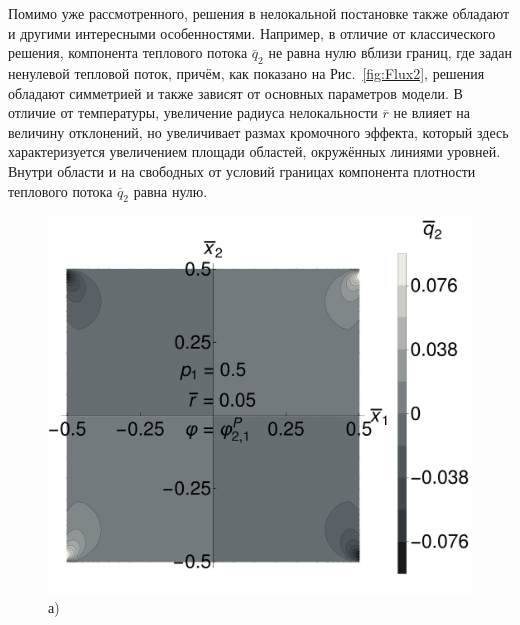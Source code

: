 Помимо уже рассмотренного, решения в нелокальной постановке также обладают и другими интересными особенностями. Например, в отличие от классического решения, компонента теплового потока $\overline{q}_2$ не равна нулю вблизи границ, где задан ненулевой тепловой поток, причём, как показано на Рис.~\ref{fig:Flux2}, решения обладают симметрией и также зависят от основных параметров модели. В отличие от температуры, увеличение радиуса нелокальности $\overline{r}$ не влияет на величину отклонений, но увеличивает размах кромочного эффекта, который здесь характеризуется увеличением площади областей, окружённых линиями уровней. Внутри области и на свободных от условий границах компонента плотности теплового потока $\overline{q}_2$ равна нулю.

\begin{figure}[ht]
    \begin{minipage}[b][][b]{0.49\linewidth}\centering
        \includegraphics[width=\linewidth]{pics/Flux2R005.pdf} \\ а)
    \end{minipage}
    \hfill
    \begin{minipage}[b][][b]{0.49\linewidth}\centering

\end{minipage}
\end{figure}
